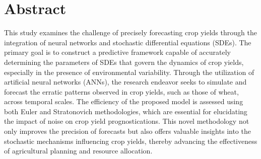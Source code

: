 \chapter*{Abstract}

This study examines the challenge of precisely forecasting crop yields through the integration of neural networks and stochastic differential equations (SDEs). The primary goal is to construct a predictive framework capable of accurately determining the parameters of SDEs that govern the dynamics of crop yields, especially in the presence of environmental variability. Through the utilization of artificial neural networks (ANNs), the research endeavor seeks to simulate and forecast the erratic patterns observed in crop yields, such as those of wheat, across temporal scales. The efficiency of the proposed model is assessed using both Euler and Stratonovich methodologies, which are essential for elucidating the impact of noise on crop yield prognostications. This novel methodology not only improves the precision of forecasts but also offers valuable insights into the stochastic mechanisms influencing crop yields, thereby advancing the effectiveness of agricultural planning and resource allocation.